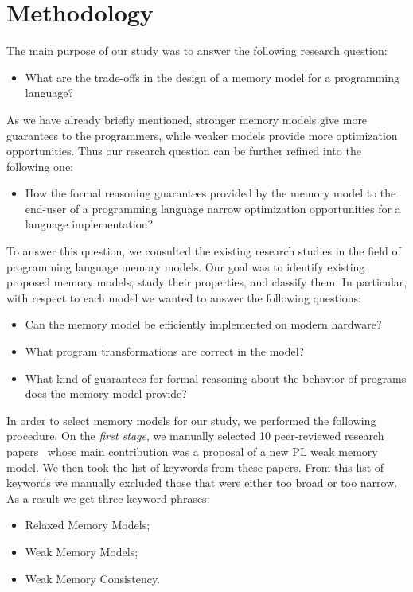 \section{Methodology}
\label{sec:methodology}

The main purpose of our study was to answer the following research question:

\begin{itemize}
  \item What are the trade-offs in the design of a memory model for a programming language?
\end{itemize}

As we have already briefly mentioned, stronger memory models 
give more guarantees to the programmers, while weaker models 
provide more optimization opportunities. 
Thus our research question can be further refined into the following one:

\begin{itemize}
  \item How the formal reasoning guarantees provided by the memory model 
    to the end-user of a programming language narrow  
    optimization opportunities for a language implementation?
\end{itemize}

To answer this question, we consulted the existing research studies 
in the field of programming language memory models.
Our goal was to identify existing proposed memory models, 
study their properties, and classify them.
In particular, with respect to each model we wanted to answer the following questions:

\begin{itemize}
  
  \item Can the memory model be efficiently implemented on modern hardware? 

  \item What program transformations are correct in the model? 

  \item What kind of guarantees for formal reasoning about the behavior 
    of programs does the memory model provide?
  
\end{itemize}

In order to select memory models for our study, we performed the following procedure.
On the \emph{first stage}, we manually selected 10  
peer-reviewed research papers~\cite{
Manson-al:POPL05,
Batty-al:POPL11,
Lahav-al:PLDI17,
Dolan-al:PLDI18,
Watt-al:PLDI2020,
Jeffrey-Riely:LICS16,
PichonPharabod-Sewell:POPL16,
Kang-al:POPL17,
Chakraborty-Vafeiadis:POPL19,
Paviotti-al:ESOP20
} 
whose main contribution was a proposal of a new PL weak memory model.
We then took the list of keywords from these papers. 
From this list of keywords we manually excluded those 
that were either too broad or too narrow.
As a result we get three keyword phrases:
\begin{itemize}
  \item Relaxed Memory Models;
  \item Weak Memory Models;
  \item Weak Memory Consistency.
\end{itemize}
 
